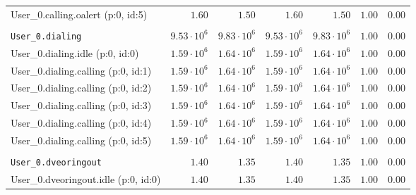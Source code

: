 \begin{table}[htbp]
{\begin{tabular}{lrrrrrr}
\hspace{3mm}User\_0.calling.oalert (p:0, id:5)        &               $1.60$ &               $1.50$ &               $1.60$ &               $1.50$ &               $1.00$ &               $0.00$ \\
\\[-8pt]\texttt{User\_0.dialing}                      &  $9.53 \cdot 10^{6}$ &  $9.83 \cdot 10^{6}$ &  $9.53 \cdot 10^{6}$ &  $9.83 \cdot 10^{6}$ &               $1.00$ &               $0.00$ \\
\hspace{3mm}User\_0.dialing.idle (p:0, id:0)          &  $1.59 \cdot 10^{6}$ &  $1.64 \cdot 10^{6}$ &  $1.59 \cdot 10^{6}$ &  $1.64 \cdot 10^{6}$ &               $1.00$ &               $0.00$ \\
\hspace{3mm}User\_0.dialing.calling (p:0, id:1)       &  $1.59 \cdot 10^{6}$ &  $1.64 \cdot 10^{6}$ &  $1.59 \cdot 10^{6}$ &  $1.64 \cdot 10^{6}$ &               $1.00$ &               $0.00$ \\
\hspace{3mm}User\_0.dialing.calling (p:0, id:2)       &  $1.59 \cdot 10^{6}$ &  $1.64 \cdot 10^{6}$ &  $1.59 \cdot 10^{6}$ &  $1.64 \cdot 10^{6}$ &               $1.00$ &               $0.00$ \\
\hspace{3mm}User\_0.dialing.calling (p:0, id:3)       &  $1.59 \cdot 10^{6}$ &  $1.64 \cdot 10^{6}$ &  $1.59 \cdot 10^{6}$ &  $1.64 \cdot 10^{6}$ &               $1.00$ &               $0.00$ \\
\hspace{3mm}User\_0.dialing.calling (p:0, id:4)       &  $1.59 \cdot 10^{6}$ &  $1.64 \cdot 10^{6}$ &  $1.59 \cdot 10^{6}$ &  $1.64 \cdot 10^{6}$ &               $1.00$ &               $0.00$ \\
\hspace{3mm}User\_0.dialing.calling (p:0, id:5)       &  $1.59 \cdot 10^{6}$ &  $1.64 \cdot 10^{6}$ &  $1.59 \cdot 10^{6}$ &  $1.64 \cdot 10^{6}$ &               $1.00$ &               $0.00$ \\
\\[-8pt]\texttt{User\_0.dveoringout}                  &               $1.40$ &               $1.35$ &               $1.40$ &               $1.35$ &               $1.00$ &               $0.00$ \\
\hspace{3mm}User\_0.dveoringout.idle (p:0, id:0)      &               $1.40$ &               $1.35$ &               $1.40$ &               $1.35$ &               $1.00$ &               $0.00$ \\

\end{tabular}}
\end{table}
